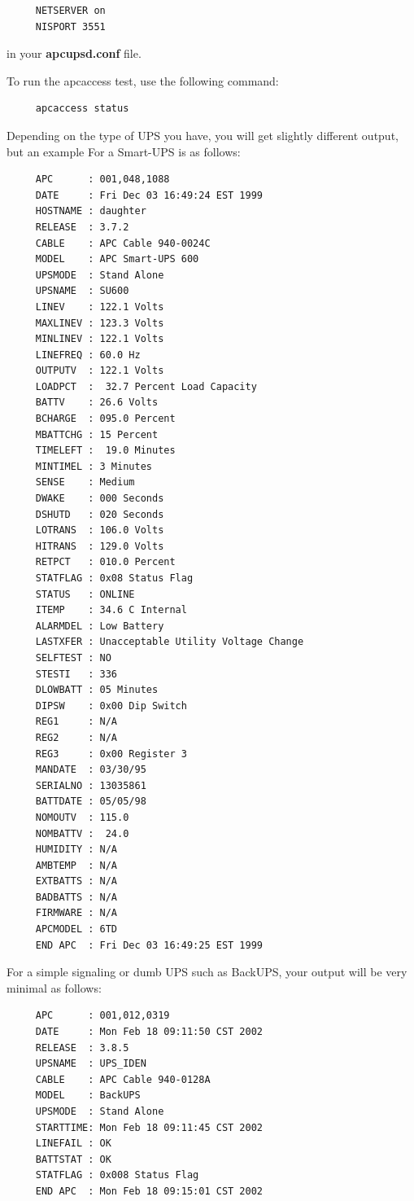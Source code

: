 \footnotesize
\begin{verbatim}
     NETSERVER on
     NISPORT 3551
\end{verbatim}
\normalsize

in your {\bf apcupsd.conf} file.  

To run the apcaccess test, use the following command: 

\footnotesize
\begin{verbatim}
     apcaccess status
\end{verbatim}
\normalsize

Depending on the type of UPS you have, you will get slightly different output,
but an example For a Smart-UPS is as follows: 

\footnotesize
\begin{verbatim}
     APC      : 001,048,1088
     DATE     : Fri Dec 03 16:49:24 EST 1999
     HOSTNAME : daughter
     RELEASE  : 3.7.2
     CABLE    : APC Cable 940-0024C
     MODEL    : APC Smart-UPS 600
     UPSMODE  : Stand Alone
     UPSNAME  : SU600
     LINEV    : 122.1 Volts
     MAXLINEV : 123.3 Volts
     MINLINEV : 122.1 Volts
     LINEFREQ : 60.0 Hz
     OUTPUTV  : 122.1 Volts
     LOADPCT  :  32.7 Percent Load Capacity
     BATTV    : 26.6 Volts
     BCHARGE  : 095.0 Percent
     MBATTCHG : 15 Percent
     TIMELEFT :  19.0 Minutes
     MINTIMEL : 3 Minutes
     SENSE    : Medium
     DWAKE    : 000 Seconds
     DSHUTD   : 020 Seconds
     LOTRANS  : 106.0 Volts
     HITRANS  : 129.0 Volts
     RETPCT   : 010.0 Percent
     STATFLAG : 0x08 Status Flag
     STATUS   : ONLINE
     ITEMP    : 34.6 C Internal
     ALARMDEL : Low Battery
     LASTXFER : Unacceptable Utility Voltage Change
     SELFTEST : NO
     STESTI   : 336
     DLOWBATT : 05 Minutes
     DIPSW    : 0x00 Dip Switch
     REG1     : N/A
     REG2     : N/A
     REG3     : 0x00 Register 3
     MANDATE  : 03/30/95
     SERIALNO : 13035861
     BATTDATE : 05/05/98
     NOMOUTV  : 115.0
     NOMBATTV :  24.0
     HUMIDITY : N/A
     AMBTEMP  : N/A
     EXTBATTS : N/A
     BADBATTS : N/A
     FIRMWARE : N/A
     APCMODEL : 6TD
     END APC  : Fri Dec 03 16:49:25 EST 1999
\end{verbatim}
\normalsize

For a simple signaling or dumb UPS such as BackUPS, your output will be very
minimal as follows: 

\footnotesize
\begin{verbatim}
     APC      : 001,012,0319
     DATE     : Mon Feb 18 09:11:50 CST 2002
     RELEASE  : 3.8.5
     UPSNAME  : UPS_IDEN
     CABLE    : APC Cable 940-0128A
     MODEL    : BackUPS
     UPSMODE  : Stand Alone
     STARTTIME: Mon Feb 18 09:11:45 CST 2002
     LINEFAIL : OK
     BATTSTAT : OK
     STATFLAG : 0x008 Status Flag
     END APC  : Mon Feb 18 09:15:01 CST 2002
\end{verbatim}
\normalsize

